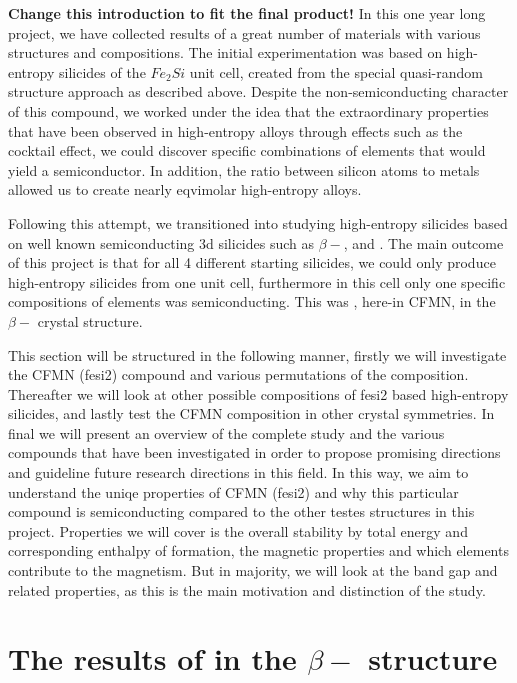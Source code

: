 \textbf{Change this introduction to fit the final product!}
In this one year long project, we have collected results of a great number of materials with various structures and compositions. The initial experimentation was based on high-entropy silicides of the $Fe_2Si$ unit cell, created from the special quasi-random structure approach as described above. Despite the non-semiconducting character of this compound, we worked under the idea that the extraordinary properties that have been observed in high-entropy alloys through effects such as the cocktail effect, we could discover specific combinations of elements that would yield a semiconductor. In addition, the ratio between silicon atoms to metals allowed us to create nearly eqvimolar high-entropy alloys. 

Following this attempt, we transitioned into studying high-entropy silicides based on well known semiconducting 3d silicides such as $\beta-$,  and . The main outcome of this project is that for all 4 different starting silicides, we could only produce high-entropy silicides from one unit cell, furthermore in this cell only one specific compositions of elements was semiconducting. This was , here-in CFMN, in the $\beta-$  crystal structure.  

This section will be structured in the following manner, firstly we will investigate the CFMN (fesi2) compound and various permutations of the composition. Thereafter we will look at other possible compositions of fesi2 based high-entropy silicides, and lastly test the CFMN composition in other crystal symmetries. In final we will present an overview of the complete study and the various compounds that have been investigated in order to propose promising directions and guideline future research directions in this field. In this way, we aim to understand the uniqe properties of CFMN (fesi2) and why this particular compound is semiconducting compared to the other testes structures in this project. Properties we will cover is the overall stability by total energy and corresponding enthalpy of formation, the magnetic properties and which elements contribute to the magnetism. But in majority, we will look at the band gap and related properties, as this is the main motivation and distinction of the study.    

\chapter{The results of  in the $\beta-$ structure}
\label{sec:good}

